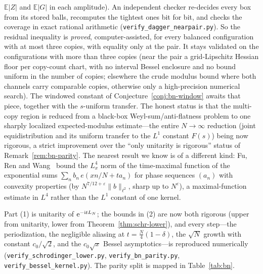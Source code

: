$\mathbb E|Z|$ and $\mathbb E|G|$ in each amplitude). An independent checker re-decides every box from its stored
balls, recomputes the tightest ones bit for bit, and checks the coverage in exact rational arithmetic
(\texttt{verify\_dagger\_nearpair.py}). So the residual inequality is \emph{proved}, computer-assisted, for every
balanced configuration with at most three copies, with equality only at the pair. It stays validated on the
configurations with more than three copies (near the pair a grid-Lipschitz Hessian floor per copy-count chart,
with no interval Bessel enclosure and no bound uniform in the number of copies; elsewhere the crude modulus bound
where both channels carry comparable copies, otherwise only a high-precision numerical search). The windowed
constant of Conjecture~\ref{conj:bn-window} awaits that piece, together with the $s$-uniform transfer. The honest status is that the multi-copy region is
reduced from a black-box Weyl-sum/anti-flatness problem to one sharply localized expected-modulus
estimate---the entire $N\to\infty$ reduction (joint equidistribution and its uniform transfer to the $L^1$
constant $F(s)$) being now rigorous, a strict improvement over the ``only unitarity is rigorous'' status of
Remark~\ref{rem:bn-parity}. The nearest result we know is of a different kind: Fu, Ren and
Wang~\cite{FuRenWang} bound the $L^4_x$ norm of the time-maximal function of the exponential sums
$\sum_nb_n\,e(xn/N+ta_n)$ for phase sequences $(a_n)$ with convexity properties (by
$N^{7/12+\varepsilon}\|b\|_{\ell^2}$, sharp up to $N^\varepsilon$), a maximal-function estimate in $L^4$ rather
than the $L^1$ constant of one kernel.

\noindent Part (1) is unitarity of $\mathrm{e}^{-\mathrm{i}tL_N}$; the bounds in (2) are now both rigorous
(upper from unitarity, lower from Theorem~\ref{thm:schr-lower}), and every step---the periodization, the
negligible aliasing at $t=\tfrac N4(1-\delta)$, the $\sqrt N$ growth with constant $c_0/\sqrt2$, and the
$c_0\sqrt x$ Bessel asymptotics---is reproduced numerically (\texttt{verify\_schrodinger\_lower.py},
\texttt{verify\_bn\_parity.py}, \texttt{verify\_bessel\_kernel.py}). The parity split is mapped in
Table~\ref{tab:bn}.

